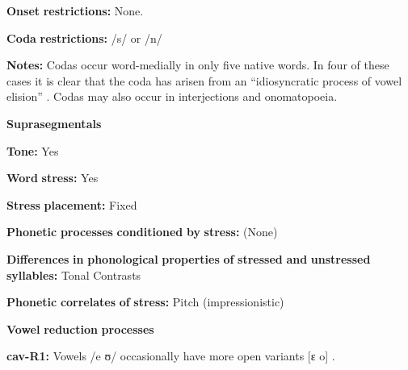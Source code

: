 \documentclass[output=paper]{langsci/langscibook}
\begin{document}
\begin{styleBody}
\textbf{Onset} \textbf{restrictions:} None.
\end{styleBody}

\begin{styleBody}
\textbf{Coda} \textbf{restrictions:} /s/ or /n/
\end{styleBody}

\begin{styleBody}
\textbf{Notes:} Codas occur word-medially in only five native words. In four of these cases it is clear that the coda has arisen from an “idiosyncratic process of vowel elision” \citep[31]{Guillaume2008}. Codas may also occur in interjections and onomatopoeia.
\end{styleBody}

\begin{styleBody}
\textbf{Suprasegmentals}
\end{styleBody}

\begin{styleBody}
\textbf{Tone:} Yes
\end{styleBody}

\begin{styleBody}
\textbf{Word} \textbf{stress:} Yes
\end{styleBody}

\begin{styleBody}
\textbf{Stress} \textbf{placement:} Fixed
\end{styleBody}

\begin{styleBody}
\textbf{Phonetic} \textbf{processes} \textbf{conditioned} \textbf{by} \textbf{stress:} (None)
\end{styleBody}

\begin{styleBody}
\textbf{Differences} \textbf{in} \textbf{phonological} \textbf{properties} \textbf{of} \textbf{stressed} \textbf{and} \textbf{unstressed} \textbf{syllables:} Tonal Contrasts
\end{styleBody}

\begin{styleBody}
\textbf{Phonetic} \textbf{correlates} \textbf{of} \textbf{stress:} Pitch (impressionistic)
\end{styleBody}

\begin{styleBody}
\textbf{Vowel} \textbf{reduction} \textbf{processes}
\end{styleBody}

\begin{styleBody}
\textbf{cav-R1:} Vowels /e ʊ/ occasionally have more open variants [ɛ o] \citep[29]{Guillaume2008}.
\end{styleBody}
\end{document}
